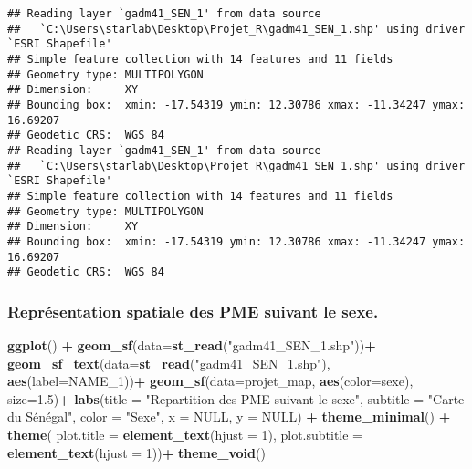\documentclass[
]{article}
\newenvironment{Shaded}{\begin{snugshade}}{\end{snugshade}}
\newcommand{\AttributeTok}[1]{\textcolor[rgb]{0.13,0.29,0.53}{#1}}
\newcommand{\ConstantTok}[1]{\textcolor[rgb]{0.56,0.35,0.01}{#1}}
\newcommand{\DecValTok}[1]{\textcolor[rgb]{0.00,0.00,0.81}{#1}}
\newcommand{\FloatTok}[1]{\textcolor[rgb]{0.00,0.00,0.81}{#1}}
\newcommand{\FunctionTok}[1]{\textcolor[rgb]{0.13,0.29,0.53}{\textbf{#1}}}
\newcommand{\NormalTok}[1]{#1}
\newcommand{\SpecialCharTok}[1]{\textcolor[rgb]{0.81,0.36,0.00}{\textbf{#1}}}
\newcommand{\StringTok}[1]{\textcolor[rgb]{0.31,0.60,0.02}{#1}}
\begin{document}
\begin{verbatim}
## Reading layer `gadm41_SEN_1' from data source 
##   `C:\Users\starlab\Desktop\Projet_R\gadm41_SEN_1.shp' using driver `ESRI Shapefile'
## Simple feature collection with 14 features and 11 fields
## Geometry type: MULTIPOLYGON
## Dimension:     XY
## Bounding box:  xmin: -17.54319 ymin: 12.30786 xmax: -11.34247 ymax: 16.69207
## Geodetic CRS:  WGS 84
## Reading layer `gadm41_SEN_1' from data source 
##   `C:\Users\starlab\Desktop\Projet_R\gadm41_SEN_1.shp' using driver `ESRI Shapefile'
## Simple feature collection with 14 features and 11 fields
## Geometry type: MULTIPOLYGON
## Dimension:     XY
## Bounding box:  xmin: -17.54319 ymin: 12.30786 xmax: -11.34247 ymax: 16.69207
## Geodetic CRS:  WGS 84
\end{verbatim}

\hypertarget{repruxe9sentation-spatiale-des-pme-suivant-le-sexe.}{%
\subsubsection{Représentation spatiale des PME suivant le
sexe.}\label{repruxe9sentation-spatiale-des-pme-suivant-le-sexe.}}

\begin{Shaded}
\begin{Highlighting}[]
\FunctionTok{ggplot}\NormalTok{() }\SpecialCharTok{+}
  \FunctionTok{geom\_sf}\NormalTok{(}\AttributeTok{data=}\FunctionTok{st\_read}\NormalTok{(}\StringTok{"gadm41\_SEN\_1.shp"}\NormalTok{))}\SpecialCharTok{+}
  \FunctionTok{geom\_sf\_text}\NormalTok{(}\AttributeTok{data=}\FunctionTok{st\_read}\NormalTok{(}\StringTok{"gadm41\_SEN\_1.shp"}\NormalTok{), }\FunctionTok{aes}\NormalTok{(}\AttributeTok{label=}\NormalTok{NAME\_1))}\SpecialCharTok{+}
  \FunctionTok{geom\_sf}\NormalTok{(}\AttributeTok{data=}\NormalTok{projet\_map, }\FunctionTok{aes}\NormalTok{(}\AttributeTok{color=}\NormalTok{sexe), }\AttributeTok{size=}\FloatTok{1.5}\NormalTok{)}\SpecialCharTok{+}
  \FunctionTok{labs}\NormalTok{(}\AttributeTok{title =} \StringTok{"Repartition des PME suivant le sexe"}\NormalTok{,}
       \AttributeTok{subtitle =} \StringTok{"Carte du Sénégal"}\NormalTok{,}
       \AttributeTok{color =} \StringTok{"Sexe"}\NormalTok{, }\AttributeTok{x =} \ConstantTok{NULL}\NormalTok{, }\AttributeTok{y =} \ConstantTok{NULL}\NormalTok{) }\SpecialCharTok{+}
  \FunctionTok{theme\_minimal}\NormalTok{() }\SpecialCharTok{+}
  \FunctionTok{theme}\NormalTok{(}
    \AttributeTok{plot.title =} \FunctionTok{element\_text}\NormalTok{(}\AttributeTok{hjust =} \DecValTok{1}\NormalTok{),}
    \AttributeTok{plot.subtitle =} \FunctionTok{element\_text}\NormalTok{(}\AttributeTok{hjust =} \DecValTok{1}\NormalTok{))}\SpecialCharTok{+}
  \FunctionTok{theme\_void}\NormalTok{()}
\end{Highlighting}
\end{Shaded}
\end{document}

